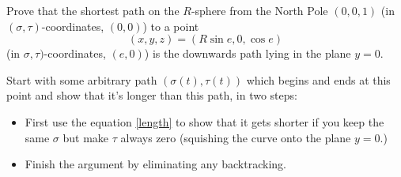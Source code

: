 \documentclass[newpage,hints,handout]{ximera}
\begin{document}
\begin{problem}
  Prove that the shortest path on the $R$-sphere from the North Pole $(0,0,1)$
  (in $(\sigma,\tau)$-coordinates, $(0,0)$) to a point
  \[
  (x,y,z)=(R\sin e,0,\cos e)
  \]
  (in $\sigma,\tau)$-coordinates, $(e,0)$) is the downwards path lying in the
  plane $y=0$.
  \begin{hint}
    Start with some arbitrary path $(\sigma(t),\tau(t))$ which begins and ends at
    this point and show that it's longer than this path, in two steps:
    \begin{itemize}
    \item First use the equation \eqref{length} to show that it gets shorter if
      you keep the same $\sigma$ but make $\tau$ always zero (squishing the curve
      onto the plane $y=0$.)
    \item Finish the argument by eliminating any backtracking.
    \end{itemize}
  \end{hint}


\end{problem}
\end{document}
